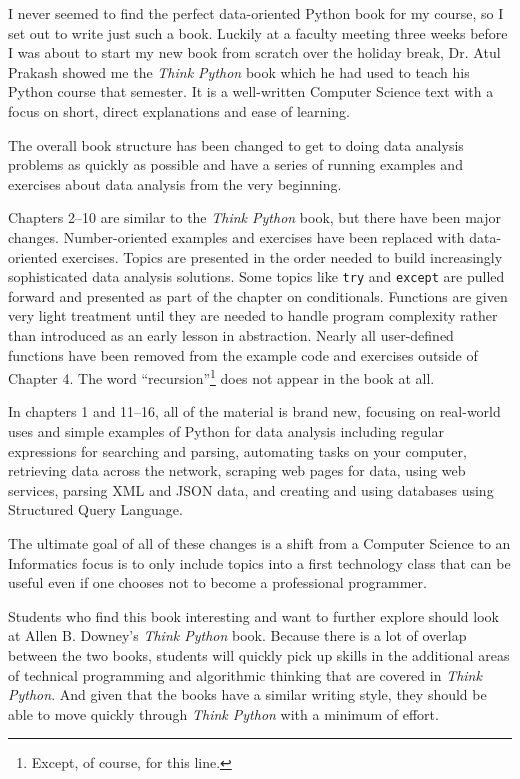 I never seemed to find the perfect data-oriented Python
book for my course, so I set out 
to write just such a book.  Luckily at a faculty meeting three weeks
before I was about to start my new book from scratch over 
the holiday break, 
Dr. Atul Prakash showed me the \emph{Think Python} book which he had
used to teach his Python course that semester.  
It is a well-written Computer Science text with a focus on 
short, direct explanations and ease of learning.  

The overall book structure
has been changed to get to doing data analysis problems as quickly as
possible and have a series of running examples and exercises 
about data analysis from the very beginning.  

Chapters 2--10 are similar to the \emph{Think Python} book,
but there have been major changes. Number-oriented examples and
exercises have been replaced with data-oriented exercises.
Topics are presented in the order needed to build increasingly
sophisticated data analysis solutions. Some topics like {\tt try} and
{\tt except} are pulled forward and presented as part of the chapter
on conditionals.  Functions are given very light treatment until 
they are needed to handle program complexity rather than introduced 
as an early lesson in abstraction.  Nearly all user-defined functions
have been removed from the example code and exercises outside of Chapter 4.
The word ``recursion''\footnote{Except, of course, for this line.}
does not appear in the book at all.

In chapters 1 and 11--16, all of the material is brand new, focusing
on real-world uses and simple examples of Python for data analysis 
including regular expressions for searching and parsing, 
automating tasks on your computer, retrieving data across 
the network, scraping web pages for data, 
using web services, parsing XML and JSON data, and creating 
and using databases using Structured Query Language.

The ultimate goal of all of these changes is a shift from a 
Computer Science to an Informatics
focus is to only include topics into a first technology 
class that can be useful even if one chooses not to 
become a professional programmer.

Students who find this book interesting and want to further explore
should look at Allen B. Downey's \emph{Think Python} book.  Because there
is a lot of overlap between the two books,
students will quickly pick up skills in the additional
areas of technical programming and algorithmic thinking 
that are covered in \emph{Think Python}.
And given that the books have a similar writing style, they should be 
able to move quickly through \emph{Think Python} with a minimum of effort.

